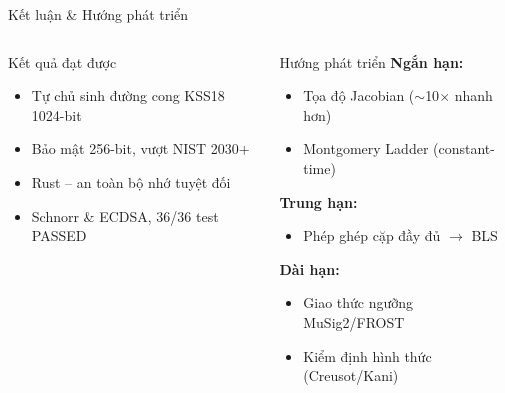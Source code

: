 \begin{frame}{Kết luận \& Hướng phát triển}
  \begin{columns}[t]
      \begin{block}{Kết quả đạt được}
        \begin{itemize}
          \item[$\checkmark$] Tự chủ sinh đường cong KSS18 1024-bit
          \item[$\checkmark$] Bảo mật 256-bit, vượt NIST 2030+
          \item[$\checkmark$] Rust -- an toàn bộ nhớ tuyệt đối
          \item[$\checkmark$] Schnorr \& ECDSA, 36/36 test PASSED
        \end{itemize}
      \end{block}
      \begin{block}{Hướng phát triển}
        \textbf{Ngắn hạn:}
        \begin{itemize}
          \item Tọa độ Jacobian ($\sim$10$\times$ nhanh hơn)
          \item Montgomery Ladder (constant-time)
        \end{itemize}
        \textbf{Trung hạn:}
        \begin{itemize}
          \item Phép ghép cặp đầy đủ $\rightarrow$ BLS
        \end{itemize}
        \textbf{Dài hạn:}
        \begin{itemize}
          \item Giao thức ngưỡng MuSig2/FROST
          \item Kiểm định hình thức (Creusot/Kani)
        \end{itemize}
      \end{block}
  \end{columns}
\end{frame}
